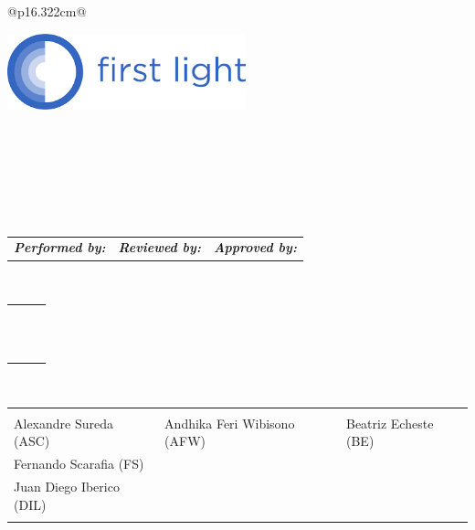 \documentclass{article}
\numberwithin{table}{section}
\numberwithin{figure}{section}
\begin{document}
\begin{center}
    \begin{spacing}{1} %
    \begin{tabular}{@{}p{16.322cm}@{}}

        \parbox{15.89cm}{\centering \includegraphics[height=2.2cm]{FLF.png}} \\
        \Large{} \\
        \Xhline{1.7pt} %
        \rule[0cm]{0pt}{1.5cm} \parbox{15.89cm}{} \\
        \rule[-1.15cm]{0pt}{1.8cm} \parbox{15.89cm}{} \\
        \Xhline{1.7pt} %
        \rule{0pt}{0.8cm} \\
        \hline
        \begin{tabular}{@{}|p{5cm}|p{5cm}|p{5cm}|@{}} \rowcolor{lightgray}
           \rule[-0.3cm]{0pt}{0.8cm} \textbf{\emph{Performed by:}} & \textbf{\emph{Reviewed by:}} & \textbf{\emph{Approved by:}} \\
        \end{tabular} \\
        \hline
        \begin{tabular}{@{}|p{5cm}|p{5cm}|p{5cm}|@{}}
           &  &  \\
           &  &  \\
           &  &  \\
           &  &  \\
           &  &  \\
           &  &  \\
           &  &  \\
           &  &  \\
           &  &  \\
           &  &  \\
           &  &  \\
           &  &  \\
        \end{tabular} \\
        \hline
        \begin{tabular}{@{}|p{5cm}|p{5cm}|p{5cm}|@{}}
            &  &  \\
           Alexandre Sureda (ASC) & Andhika Feri Wibisono (AFW) & Beatriz Echeste (BE) \\
Fernando Scarafia (FS) &  &  \\
Juan Diego Iberico (DIL) &  &  \\
 & & \\


\end{tabular}
\end{tabular}
\end{spacing}
\end{center}
\end{document}
